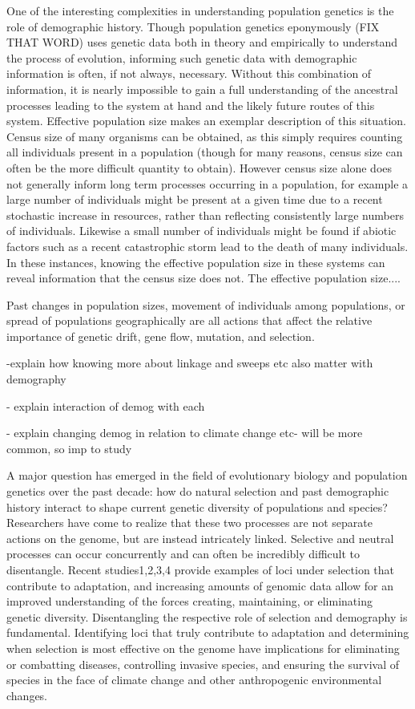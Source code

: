 One of the interesting complexities in understanding population genetics is the role of demographic history. Though population genetics eponymously (FIX THAT WORD) uses genetic data both in theory and empirically to understand the process of evolution, informing such genetic data with demographic information is often, if not always, necessary. Without this combination of information, it is nearly impossible to gain a full understanding of the ancestral processes leading to the system at hand and the likely future routes of this system. Effective population size makes an exemplar description of this situation. Census size of many organisms can be obtained, as this simply requires counting all individuals present in a population (though for many reasons, census size can often be the more difficult quantity to obtain). However census size alone does not generally inform long term processes occurring in a population, for example a large number of individuals might be present at a given time due to a recent stochastic increase in resources, rather than reflecting consistently large numbers of individuals. Likewise a small number of individuals might be found if abiotic factors such as a recent catastrophic storm lead to the death of many individuals. In these instances, knowing the effective population size in these systems can reveal information that the census size does not. The effective population size....

Past changes in population sizes, movement of individuals among populations, or spread of populations geographically are all actions that affect the relative importance of genetic drift, gene flow, mutation, and selection.

-explain how knowing more about linkage and sweeps etc also matter with demography

- explain interaction of demog with each

- explain changing demog in relation to climate change etc- will be more common, so imp to study


A major question has emerged in the field of evolutionary biology and population genetics over the past decade: how do natural selection and past demographic history interact to shape current genetic diversity of populations and species? Researchers have come to realize that these two processes are not separate actions on the genome, but are instead intricately linked. Selective and neutral processes can occur concurrently and can often be incredibly difficult to disentangle. Recent studies1,2,3,4 provide examples of loci under selection that contribute to adaptation, and increasing amounts of genomic data allow for an improved understanding of the forces creating, maintaining, or eliminating genetic diversity. Disentangling the respective role of selection and demography is fundamental. Identifying loci that truly contribute to adaptation and determining when selection is most effective on the genome have implications for eliminating or combatting diseases, controlling invasive species, and ensuring the survival of species in the face of climate change and other anthropogenic environmental changes.

